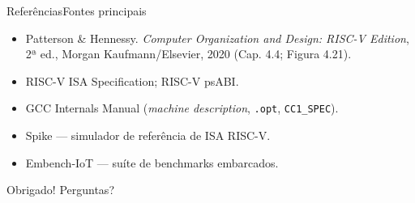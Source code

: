 \documentclass[aspectratio=169]{beamer} %
\begin{document}
\begin{frame}{Referências}{Fontes principais}
    \small
    \begin{itemize}
        \item Patterson \& Hennessy. \textit{Computer Organization and Design:
              RISC-V Edition}, 2ª ed., Morgan Kaufmann/Elsevier, 2020
              (Cap. 4.4; Figura 4.21).
        \item RISC-V ISA Specification; RISC-V psABI.
        \item GCC Internals Manual (\textit{machine description},
              \texttt{.opt}, \texttt{CC1\_SPEC}).
        \item Spike --- simulador de referência de ISA RISC-V.
        \item Embench-IoT --- suíte de benchmarks embarcados.
    \end{itemize}
    \vfill
    \centering \Large Obrigado! \quad Perguntas?
\end{frame}
\end{document}
